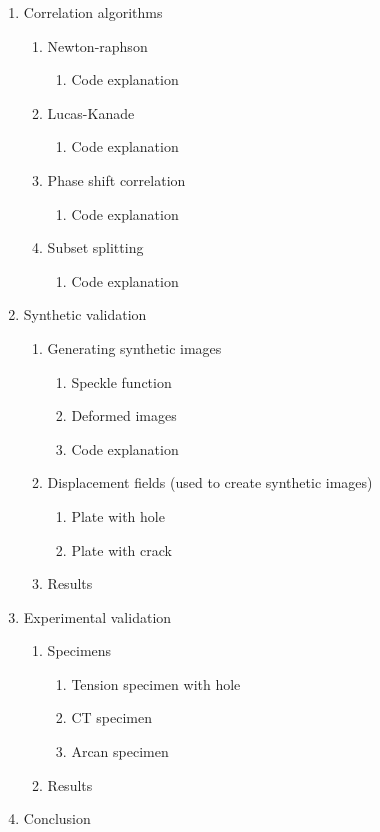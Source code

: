 \documentclass[12pt,oneside,openany,a4paper, %
english, %
masters-t, goldenblock]{usthesis}
\begin{document}
\begin{enumerate}
\item Correlation algorithms
  \begin{enumerate}
    \item Newton-raphson
      \begin{enumerate}
        \item Code explanation
      \end{enumerate}
    \item Lucas-Kanade
      \begin{enumerate}
        \item Code explanation
      \end{enumerate}
    \item Phase shift correlation
      \begin{enumerate}
        \item Code explanation
      \end{enumerate}
    \item Subset splitting
      \begin{enumerate}
        \item Code explanation
      \end{enumerate}
  \end{enumerate}
\item Synthetic validation
  \begin{enumerate}
    \item Generating synthetic images
    \begin{enumerate}
      \item Speckle function
      \item Deformed images
      \item Code explanation
    \end{enumerate}
    \item Displacement fields (used to create synthetic images)
    \begin{enumerate}
      \item Plate with hole
      \item Plate with crack
    \end{enumerate}
    \item Results
  \end{enumerate}
\item Experimental validation
  \begin{enumerate}
    \item Specimens
    \begin{enumerate}
      \item Tension specimen with hole
      \item CT specimen
      \item Arcan specimen
    \end{enumerate}
  \item Results
  \end{enumerate}
\item Conclusion
\end{enumerate}
\end{document}
